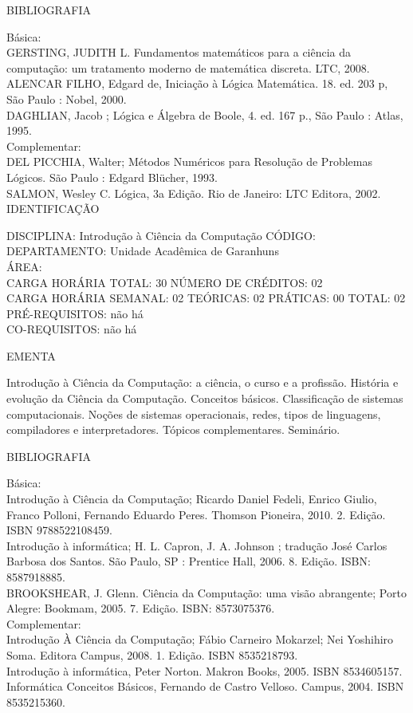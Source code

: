 \documentclass[
	12pt,				%
	openright,			%
  oneside,     %
	a4paper,			%
	chapter=TITLE,		%
	english,			%
	french,				%
	spanish,			%
	brazil				%
	]{abntex2}
\begin{document}
\begin{apendicesenv}
BIBLIOGRAFIA

Básica: \\
GERSTING, JUDITH L. Fundamentos matemáticos para a ciência da
computação: um tratamento moderno de matemática discreta. LTC, 2008.\\
ALENCAR FILHO, Edgard de, Iniciação à Lógica Matemática. 18. ed. 203 p,
São Paulo : Nobel, 2000.\\
DAGHLIAN, Jacob ; Lógica e Álgebra de Boole, 4. ed. 167 p., São Paulo :
Atlas, 1995.\\
Complementar: \\
DEL PICCHIA, Walter; Métodos Numéricos para Resolução de Problemas
Lógicos. São Paulo : Edgard Blücher, 1993.\\
SALMON, Wesley C. Lógica, 3a Edição. Rio de Janeiro: LTC Editora, 2002.\\


\newpage IDENTIFICAÇÃO

DISCIPLINA: Introdução à Ciência da Computação CÓDIGO:\\
DEPARTAMENTO: Unidade Acadêmica de Garanhuns\\
ÁREA: \\
CARGA HORÁRIA TOTAL: 30 NÚMERO DE CRÉDITOS: 02\\
CARGA HORÁRIA SEMANAL: 02 TEÓRICAS: 02 PRÁTICAS: 00 TOTAL: 02\\
PRÉ-REQUISITOS: não há\\
CO-REQUISITOS: não há
 
EMENTA 
 
Introdução à Ciência da Computação: a ciência, o curso e a profissão.
História e evolução da Ciência da Computação. Conceitos básicos.
Classificação de sistemas computacionais. Noções de sistemas
operacionais, redes, tipos de linguagens, compiladores e
interpretadores. Tópicos complementares. Seminário.

BIBLIOGRAFIA 

Básica:\\
Introdução à Ciência da Computação; Ricardo Daniel Fedeli, Enrico
Giulio, Franco Polloni, Fernando Eduardo Peres. Thomson Pioneira, 2010.
2. Edição. ISBN 9788522108459.\\
Introdução à informática; H. L. Capron, J. A. Johnson ; tradução José
Carlos\\
Barbosa dos Santos. São Paulo, SP : Prentice Hall, 2006. 8. Edição. ISBN: 8587918885.\\
BROOKSHEAR, J. Glenn. Ciência da Computação: uma visão abrangente; Porto
Alegre: Bookmam, 2005. 7. Edição. ISBN: 8573075376.\\
Complementar:\\
Introdução À Ciência da Computação; Fábio Carneiro Mokarzel; Nei
Yoshihiro Soma. Editora Campus, 2008. 1. Edição. ISBN 8535218793.\\
Introdução à informática, Peter Norton. Makron Books, 2005. ISBN
8534605157.\\
Informática Conceitos Básicos, Fernando de Castro Velloso. Campus, 2004.
ISBN 8535215360.\\



\end{apendicesenv}
\end{document}
